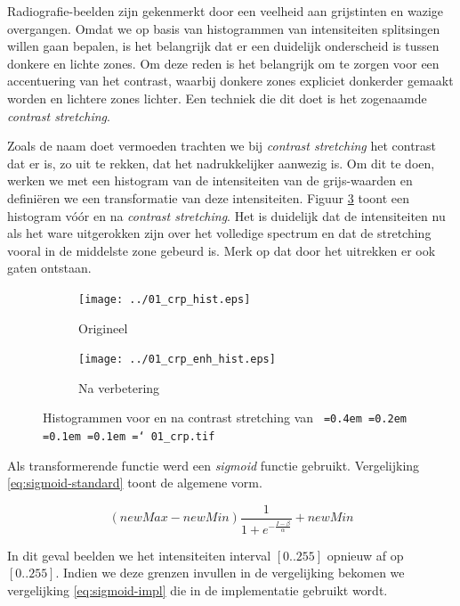 \documentclass[10pt,a4paper]{article}
\newcommand*\justify{%
  \fontdimen2\font=0.4em%
  \fontdimen3\font=0.2em%
  \fontdimen4\font=0.1em%
  \fontdimen7\font=0.1em%
  \hyphenchar\font=`\-%
}
\newcommand{\ttt}[1]{{\tt \justify{#1}}}
\begin{document}
Radiografie-beelden zijn gekenmerkt door een veelheid aan grijstinten en wazige overgangen. Omdat we op basis van histogrammen van intensiteiten splitsingen willen gaan bepalen, is het belangrijk dat er een duidelijk onderscheid is tussen donkere en lichte zones. Om deze reden is het belangrijk om te zorgen voor een accentuering van het contrast, waarbij donkere zones expliciet donkerder gemaakt worden en lichtere zones lichter. Een techniek die dit doet is het zogenaamde \emph{contrast stretching}.

Zoals de naam doet vermoeden trachten we bij \emph{contrast stretching} het contrast dat er is, zo uit te rekken, dat het nadrukkelijker aanwezig is. Om dit te doen, werken we met een histogram van de intensiteiten van de grijs-waarden en defini\"eren we een transformatie van deze intensiteiten. Figuur \ref{fig:contrast-stretching-histograms} toont een histogram v\'o\'or en na \emph{contrast stretching}. Het is duidelijk dat de intensiteiten nu als het ware uitgerokken zijn over het volledige spectrum en dat de stretching vooral in de middelste zone gebeurd is. Merk op dat door het uitrekken er ook gaten ontstaan.

\begin{figure}
\centering
\begin{subfigure}{.49\textwidth}
  \centering
  \texttt{[image: ../01\_crp\_hist.eps]}
  \caption{Origineel}
  \label{fig:original-histogram}
\end{subfigure}
\begin{subfigure}{.49\textwidth}
  \centering
  \texttt{[image: ../01\_crp\_enh\_hist.eps]}
  \caption{Na verbetering}
  \label{fig:enhanced-histogram}
\end{subfigure}
\label{fig:contrast-stretching-histograms}
\caption{Histogrammen voor en na contrast stretching van \ttt{01\_crp.tif}}
\end{figure}

Als transformerende functie werd een \emph{sigmoid} functie gebruikt. Vergelijking \ref{eq:sigmoid-standard} toont de algemene vorm.

\begin{equation} \label{eq:sigmoid-standard}
(newMax - newMin) \frac{1}{1+e^{-\frac{I - \beta}{\alpha}}} + newMin
\end{equation}

In dit geval beelden we het intensiteiten interval $[0..255]$ opnieuw af op $[0..255]$. Indien we deze grenzen invullen in de vergelijking bekomen we vergelijking \ref{eq:sigmoid-impl} die in de implementatie gebruikt wordt.
\end{document}
